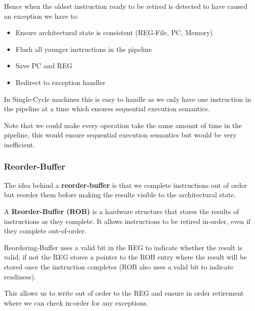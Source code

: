 Hence when the oldest instruction ready to be retired is detected to have caused an exception we have to:
\begin{itemize}
    \item Ensure architectural state is consistent (REG-File, PC, Memory)
    \item Flush all younger instructions in the pipeline
    \item Save PC and REG
    \item Redirect to exception handler
\end{itemize}

\begin{remark}
    In Single-Cycle machines this is easy to handle as we only have one instruction in the pipeline at a time which ensures sequential execution semantics.
\end{remark}

\begin{remark}
    Note that we could make every operation take the same amount of time in the pipeline, this would ensure sequential execution semantics but would be very inefficient.
\end{remark}

\subsubsection{Reorder-Buffer}

The idea behind a \textbf{reorder-buffer} is that we complete instructions out of order but reorder them before making the results visible to the architectural state.

\begin{definition}
    A \textbf{Reorder-Buffer (ROB)} is a hardware structure that stores the results of instructions as they complete. It allows instructions to be retired in-order, even if they complete out-of-order.
\end{definition}

\begin{lemma}
    Reordering-Buffer uses a valid bit in the REG to indicate whether the result is valid, if not the REG stores a pointer to the ROB entry where the result will be stored once the instruction completes (ROB also uses a valid bit to indicate readiness).
\end{lemma}

This allows us to write out of order to the REG and ensure in order retirement where we can check in-order for any exceptions.



